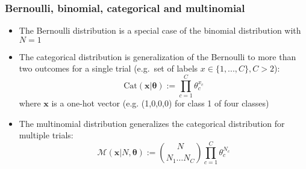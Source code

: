 \documentclass[usenames,dvipsnames,smaller]{beamer}
\newcommand{\?}{\stackrel{?}{=}}
\begin{document}
\begin{frame}
  \frametitle{Bernoulli, binomial, categorical and multinomial}
  \begin{itemize}
  \item The Bernoulli distribution is a special case of the binomial distribution with $N = 1$\pause
  \item The categorical distribution is generalization of the Bernoulli to more than two outcomes for a single trial (e.g.\ set of labels $x \in \{1, ..., C\}, C > 2$):
    \pause
    \begin{equation}
      \mathrm{Cat}(\bm x| \bm{\theta}) := \prod_{c=1}^{C} \theta_c^{x_c}
    \end{equation}
    where $\bm x$ is a one-hot vector (e.g. (1,0,0,0) for class 1 of four classes)
    \pause
  \item The multinomial distribution generalizes the categorical distribution for multiple trials: \pause
    \begin{equation}
      \mathscr{M}(\bm{x}| N, \bm{\theta}) := {N \choose {N_1 \ldots N_C}} \prod_{c=1}^C\theta_c^{N_c}
    \end{equation}
  \end{itemize}
\end{frame}
\end{document}
